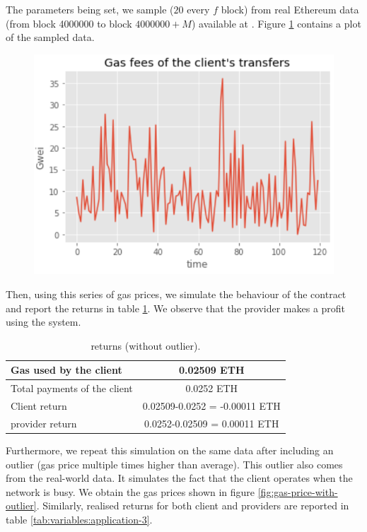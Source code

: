 The parameters being set, we sample ($20$ every $f$ block) from real Ethereum data (from block 4000000 to block $4000000+M$) available at \cite{EthereumBlockData}. Figure \ref{fig:gas-price-no-outlier} contains a plot of the sampled data.
\begin{figure}[h]
\centering
\includegraphics[scale=0.55]{figures/gas fees client transfer.png}
\label{fig:gas-price-no-outlier}
\end{figure}
Then, using this series of gas prices, we simulate the behaviour of the contract and report the returns in table \ref{tab:variables:application-2}. We observe that the provider makes a profit using the system. 

\begin{table}[htbp]
\caption{{\projectName} returns  (without outlier). }
\begin{center}
\begin{tabular}{|l|c|}
\hline
Gas used by the client & 0.02509 ETH \\
\hline
Total payments of the client & 0.0252 ETH \\
\hline
Client return &  0.02509-0.0252 = -0.00011 ETH \\
\hline
provider return &  0.0252-0.02509  = 0.00011 ETH \\
\hline
\end{tabular}
\label{tab:variables:application-2}
\end{center}
\end{table}
Furthermore, we repeat this simulation on the same data after including an outlier (gas price multiple times higher than average). This outlier also comes from the real-world data. It simulates the fact that the client operates when the network is busy. We obtain the gas prices shown in figure \ref{fig:gas-price-with-outlier}. Similarly, realised returns for both client and providers are reported in table \ref{tab:variables:application-3}. 


